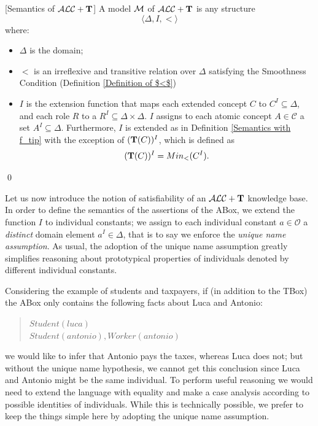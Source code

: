 \documentclass[a4paper, 11pt, oneside]{duthesis}
\newcommand{\tip}{{\bf T}}
\newcommand{\alct}{\mathcal{ALC}+\tip}
\newcommand{\emme} {\begin{mathcal}M\end{mathcal}}
\newenvironment{definition}
{\begin{defi} \rm}{\qed \end{defi}}
\newenvironment{definition}
{\begin{defi} \rm}{\qed \end{defi}}
\newtheorem{definition}{Definition}
\newcounter{posu}
\newtheorem{definition}[posu]{Definition}
\begin{document}
\begin{definition}[Semantics of $\alct$]\label{Semantics of T} A model $\emme$ of $\alct$ is any structure $$\langle \Delta, I, < \rangle$$ where:

\begin{itemize}

\item $\Delta$ is the domain;

\item $<$ is an irreflexive and transitive relation over $\Delta$ satisfying the Smoothness Condition (Definition \ref{Definition of $<$})

\item $I$ is the extension function that maps each  extended concept $C$ to $C^I \subseteq \Delta$, and each role $R$ to a $R^I \subseteq \Delta \times \Delta$.
$I$ assigns to each atomic concept $A \in \mathcal{C}$ a set $A^I \subseteq \Delta$.
Furthermore, $I$ is extended as in Definition \ref{Semantics with f_tip} with the exception of $(\tip(C))^I$, which is defined as $$(\tip(C))^I = Min_<(C^I).$$
\end{itemize}

\end{definition}

\noindent Let us now introduce the notion of satisfiability of an $\alct$ knowledge base.
In order to define the semantics of the assertions of the ABox, we  extend the function $I$ to individual constants;  we assign to each individual constant $a \in \mathcal{O}$ a \emph{distinct} domain element $a^I \in \Delta$, that is to say we enforce the \emph{unique name assumption}.
As usual, the adoption of the  unique name assumption greatly simplifies reasoning about prototypical properties of individuals denoted by different individual constants.


Considering the example of students and taxpayers, if (in addition to the TBox) the ABox only contains the following facts about Luca and Antonio:

\begin{quote}
$\mathit{Student}(\mathit{luca})$ \\
$\mathit{Student}(\mathit{antonio}), \mathit{Worker}(\mathit{antonio})$
\end{quote}

\noindent we would like to infer that Antonio pays the taxes, whereas Luca does not; but without the unique name hypothesis, we cannot get this conclusion since Luca and Antonio might be the same individual.
To perform useful reasoning we would need to  extend the language with equality and make a case analysis according to possible identities of individuals. While this is technically possible, we prefer to keep the things simple here by adopting the unique name assumption.
\end{document}
